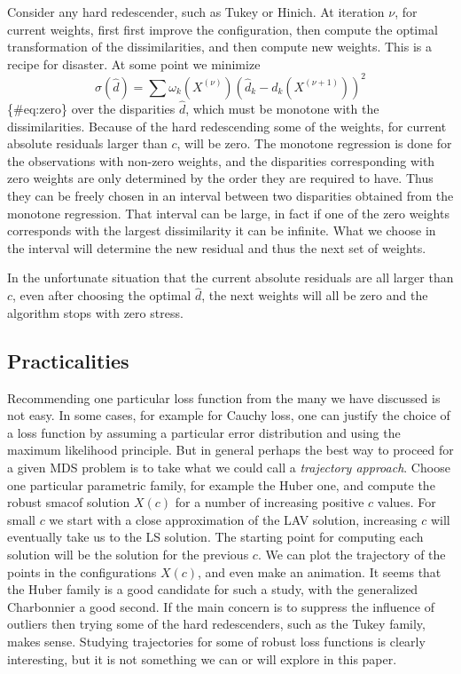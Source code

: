 \documentclass[
  12pt,
  letterpaper,
  DIV=11,
  numbers=noendperiod]{scrartcl}
\theoremstyle{definition}
\theoremstyle{plain}
\theoremstyle{plain}
\theoremstyle{remark}
\begin{document}
Consider any hard redescender, such as Tukey or Hinich. At iteration
\(\nu\), for current weights, first first improve the configuration,
then compute the optimal transformation of the dissimilarities, and then
compute new weights. This is a recipe for disaster. At some point we
minimize \[
\sigma(\hat d)=\sum \omega_k(X^{(\nu)})(\hat d_k-d_k(X^{(\nu+1)}))^2
\]\{\#eq:zero\} over the disparities \(\hat d\), which must be monotone
with the dissimilarities. Because of the hard redescending some of the
weights, for current absolute residuals larger than \(c\), will be zero.
The monotone regression is done for the observations with non-zero
weights, and the disparities corresponding with zero weights are only
determined by the order they are required to have. Thus they can be
freely chosen in an interval between two disparities obtained from the
monotone regression. That interval can be large, in fact if one of the
zero weights corresponds with the largest dissimilarity it can be
infinite. What we choose in the interval will determine the new residual
and thus the next set of weights.

In the unfortunate situation that the current absolute residuals are all
larger than \(c\), even after choosing the optimal \(\hat d\), the next
weights will all be zero and the algorithm stops with zero stress.

\subsection{Practicalities}\label{practicalities}

Recommending one particular loss function from the many we have
discussed is not easy. In some cases, for example for Cauchy loss, one
can justify the choice of a loss function by assuming a particular error
distribution and using the maximum likelihood principle. But in general
perhaps the best way to proceed for a given MDS problem is to take what
we could call a \emph{trajectory approach}. Choose one particular
parametric family, for example the Huber one, and compute the robust
smacof solution \(X(c)\) for a number of increasing positive \(c\)
values. For small \(c\) we start with a close approximation of the LAV
solution, increasing \(c\) will eventually take us to the LS solution.
The starting point for computing each solution will be the solution for
the previous \(c\). We can plot the trajectory of the points in the
configurations \(X(c)\), and even make an animation. It seems that the
Huber family is a good candidate for such a study, with the generalized
Charbonnier a good second. If the main concern is to suppress the
influence of outliers then trying some of the hard redescenders, such as
the Tukey family, makes sense. Studying trajectories for some of robust
loss functions is clearly interesting, but it is not something we can or
will explore in this paper.
\end{document}
